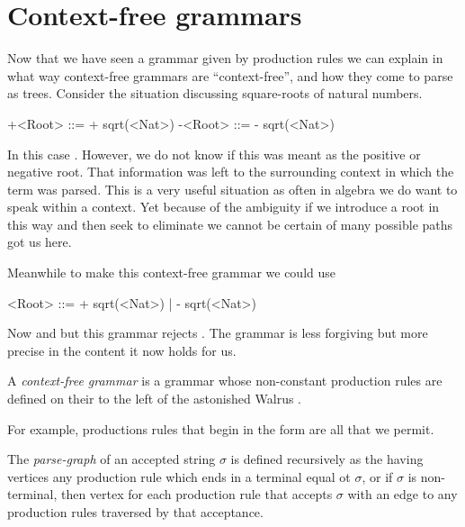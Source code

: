 
\section{Context-free grammars}


Now that we have seen a grammar given by production rules we can explain 
in what way context-free grammars are ``context-free'', and how they 
come to parse as trees.  Consider the situation discussing square-roots 
of natural numbers.
\begin{center}
\begin{gcode}[]
+<Root> ::= + sqrt(<Nat>)
-<Root> ::= - sqrt(<Nat>)
\end{gcode}
\end{center}
In this case .  However, we do not know if this 
was meant as the positive or negative root.  That information 
was left to the surrounding context in which the term was parsed.  
This is a very useful situation as often in algebra we do want to 
speak within a context.  Yet because of the ambiguity if we 
introduce a root in this way and then seek to eliminate we 
cannot be certain of many possible paths got us here.

Meanwhile 
to make this context-free grammar we could use 
\begin{center}
\begin{gcode}[]
<Root> ::= + sqrt(<Nat>)
         | - sqrt(<Nat>)
\end{gcode}
\end{center}
Now  and  but 
this grammar rejects .  The grammar is less forgiving 
but more precise in the content it now holds for us.

\begin{definition}
    A \emph{context-free grammar} is a grammar whose non-constant 
    production rules are defined on their to the left of the astonished Walrus 
    \code{::=}.
\end{definition}

For example, productions rules that begin in the form 
are all that we permit.

\begin{definition}
    The \emph{parse-graph} of an accepted string $\sigma$ is 
    defined recursively as the having vertices any production rule 
    which ends in a terminal equal ot $\sigma$, or 
    if $\sigma$ is non-terminal, then vertex for each production rule 
    that accepts $\sigma$ with an edge to any production rules traversed
    by that acceptance.
\end{definition}

